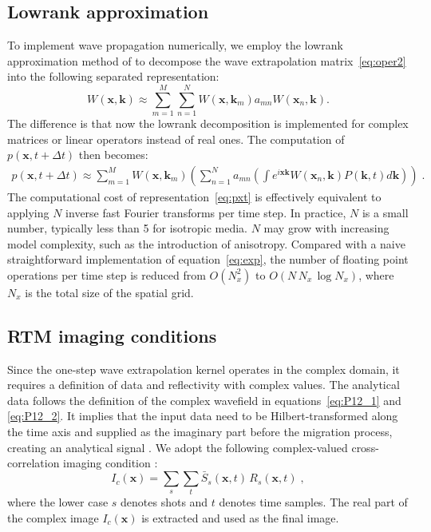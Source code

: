 \subsection{Lowrank approximation}
To implement wave propagation numerically, we employ the lowrank approximation method of \cite{lowrank} to decompose the wave extrapolation matrix~\ref{eq:oper2} into the following separated representation:
\begin{equation}
  \label{eq:lra}
  W(\mathbf{x},\mathbf{k}) \approx \sum\limits_{m=1}^M \sum\limits_{n=1}^N W(\mathbf{x},\mathbf{k}_m) a_{mn} W(\mathbf{x}_n,\mathbf{k}).
\end{equation}
The difference is that now the lowrank decomposition is implemented for complex matrices or linear operators instead of real ones. The computation of $p(\mathbf{x},t+\Delta t)$ then becomes:
\begin{eqnarray}
\label{eq:pxt}
p(\mathbf{x},t+\Delta t) \approx \sum\limits_{m=1}^M W(\mathbf{x},\mathbf{k}_m) \left( \sum\limits_{n=1}^N a_{mn} \left(\int e^{i \mathbf{x}\mathbf{k}} W(\mathbf{x}_n,\mathbf{k}) P(\mathbf{k},t) d\mathbf{k} \right) \right)\; .
\end{eqnarray}
The computational cost of representation~\ref{eq:pxt} is effectively equivalent to applying $N$ inverse fast Fourier transforms per time step. In practice, $N$ is a small number, typically less than 5 for isotropic media. $N$ may grow with increasing model complexity, such as the introduction of anisotropy. Compared with a naive straightforward implementation of equation~\ref{eq:exp}, the number of floating point operations per time step is reduced from $O(N_x^2)$ to $O(N\,N_x\,\log{N_x})$, where $N_x$ is the total size of the spatial grid.

\subsection{RTM imaging conditions}
Since the one-step wave extrapolation kernel operates in the complex domain, it requires a definition of data and reflectivity with complex values. The analytical data follows the definition of the complex wavefield in equations~\ref{eq:P12_1} and \ref{eq:P12_2}. It implies that the input data need to be Hilbert-transformed along the time axis and supplied as the imaginary part before the migration process, creating an analytical signal \cite[]{taner79}. We adopt the following complex-valued cross-correlation imaging condition \cite[]{claerbout1}:
\begin{equation}
  \label{eq:img}
I_c(\mathbf{x}) = \sum\limits_s \sum\limits_t\bar{S}_s(\mathbf{x},t)\,R_s(\mathbf{x},t) \; ,
\end{equation}
where the lower case $s$ denotes shots and $t$ denotes time samples. The real part of the complex image $I_c(\mathbf{x})$ is extracted and used as the final image.


